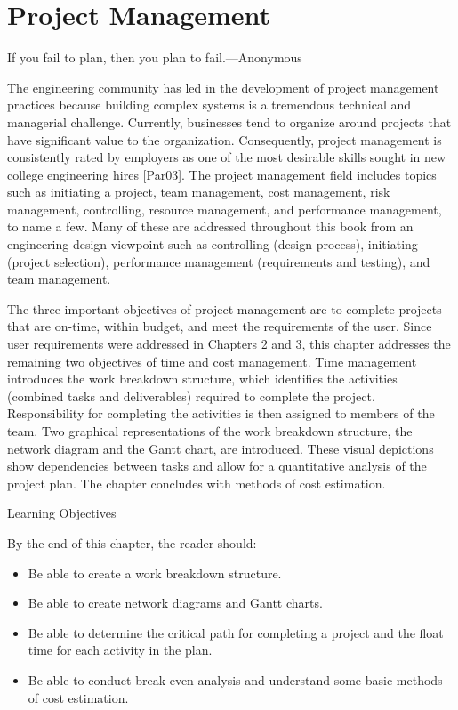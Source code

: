 \chapter{ Project Management}


If you fail to plan, then you plan to fail.---Anonymous

The engineering community has led in the development of project
management practices because building complex systems is a tremendous
technical and managerial challenge. Currently, businesses tend to
organize around projects that have significant value to the
organization. Consequently, project management is consistently rated by
employers as one of the most desirable skills sought in new college
engineering hires {[}Par03{]}. The project management field includes
topics such as initiating a project, team management, cost management,
risk management, controlling, resource management, and performance
management, to name a few. Many of these are addressed throughout this
book from an engineering design viewpoint such as controlling (design
process), initiating (project selection), performance management
(requirements and testing), and team management.

The three important objectives of project management are to complete
projects that are on-time, within budget, and meet the requirements of
the user. Since user requirements were addressed in Chapters 2 and 3,
this chapter addresses the remaining two objectives of time and cost
management. Time management introduces the work breakdown structure,
which identifies the activities (combined tasks and deliverables)
required to complete the project. Responsibility for completing the
activities is then assigned to members of the team. Two graphical
representations of the work breakdown structure, the network diagram and
the Gantt chart, are introduced. These visual depictions show
dependencies between tasks and allow for a quantitative analysis of the
project plan. The chapter concludes with methods of cost estimation.

Learning Objectives

By the end of this chapter, the reader should:

\begin{itemize}
\item
  Be able to create a work breakdown structure.
\item
  Be able to create network diagrams and Gantt charts.
\item
  Be able to determine the critical path for completing a project and
  the float time for each activity in the plan.
\item
  Be able to conduct break-even analysis and understand some basic
  methods of cost estimation.
\end{itemize}

